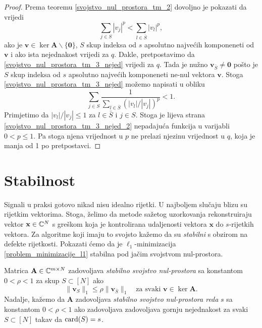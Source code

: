 \documentclass[a4paper,twoside,12pt]{memoir} %
\newcommand{\vect}[1]{\mathbf{#1}}
\renewcommand{\vec}{\vect}
\newcommand{\card}{\text{\normalfont{card}}}
\newcommand{\norm}[1]{\|{#1}\|}
\begin{document}
\begin{proof}
    Prema teoremu \ref{svojstvo_nul_prostora_tm_2} dovoljno je pokazati da vrijedi
    \begin{equation}\label{svojstvo_nul_prostora_tm_3_nejed}
        \sum_{j \in S} |v_j|^p < \sum_{l \in \bar S}|v_l|^p,
    \end{equation}
    ako je $\vec v \in \ker \vec A \backslash \{\vec 0\}$, $S$ skup indeksa od $s$ apsolutno najve\'cih komponeneti od $\vec v$ i ako ista nejednakost vrijedi za $q$.
    Dakle, pretpostavimo da \eqref{svojstvo_nul_prostora_tm_3_nejed} vrijedi za $q$. Tada je nu\v{z}no $\vec v_{\bar S} \neq \vec 0$ po\v{s}to je $S$ skup indeksa od $s$ apsolutno najve\'cih komponeneti ne-nul vektora $\vec v$. Stoga \eqref{svojstvo_nul_prostora_tm_3_nejed} mo\v{z}emo napisati u obliku
    \begin{equation}\label{svojstvo_nul_prostora_tm_3_nejed_2}
        \sum_{j \in S} \frac{1}{\sum_{l \in \bar S}(|v_l|/|v_j|)^p} < 1.  
    \end{equation}
    Primjetimo da $|v_l|/|v_j| \leq 1$ za $l \in \bar S$ i $j \in S$. Stoga je lijeva strana \eqref{svojstvo_nul_prostora_tm_3_nejed_2} nepadaju\'ca funkcija u varijabli $0<p \leq 1$. Pa stoga njena vrijednost u $p$ ne prelazi njezinu vrijednost u $q$, koja je manja od 1 po pretpostavci.
\end{proof}

\section[Stabilnost][Stabilnost]{Stabilnost}
Signali u praksi gotovo nikad nisu idealno rijetki. U najboljem slu\v{c}aju blizu su rijetkim vektorima. Stoga, \v{z}elimo da metode sa\v{z}etog uzorkovanja rekonstruiraju vektor $\vec x \in \C^N$ s gre\v{s}kom koja je kontrolirana udaljenosti vektora $\vec x$ do $s$-rijetkih vektora. Za algoritme koji imaju to svojsto ka\v{z}emo da su \textit{stabilni} s obzirom na defekte rijetkosti. Pokazati \'cemo da je $\ell_1$-minimizacija \eqref{problem_minimizacije_l1} stabilna pod ja\v{c}im svojstvom nul-prostora.

\begin{defn}
    Matrica $\vec A \in \C^{m \times N}$ zadovoljava \textit{stabilno svojstvo nul-prostora} sa konstantom $0<\rho<1$ za skup $S \subset [N]$ ako
    \begin{equation*}
        \norm{\vec v_S}_1 \leq \rho \norm{\vec v_{\bar S}}_1 \quad \text{za svaki }\vec v \in \ker \vec A.
    \end{equation*}
    Nadalje, ka\v{z}emo da $\vec A$ zadovoljava \textit{stabilno svojstvo nul-prostora reda} $s$ sa konstantom $0<\rho<1$ ako zadovoljava zadovoljava gornju nejednakost za svaki $S \subset [N]$ takav da $\card(S)=s$.
\end{defn}
\end{document}
